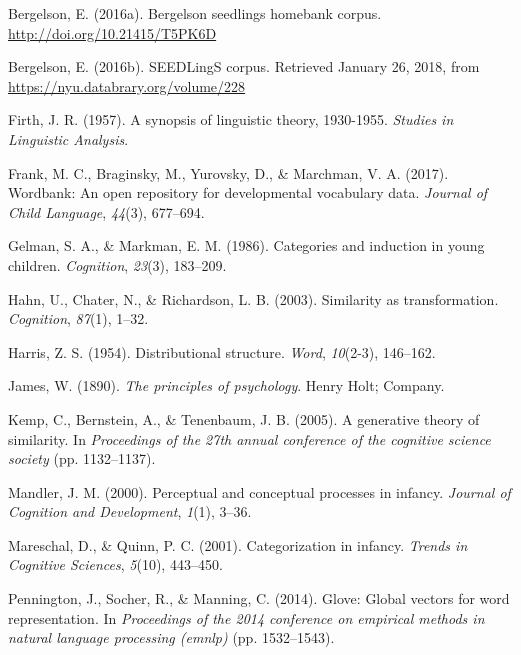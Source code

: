 \documentclass[10pt, letterpaper]{article}
\begin{document}
\hypertarget{refs}{}
\hypertarget{ref-bergelson2016seedlings}{}
Bergelson, E. (2016a). Bergelson seedlings homebank corpus.
\url{http://doi.org/10.21415/T5PK6D}

\hypertarget{ref-bergelson2016seedlingsdatabrary}{}
Bergelson, E. (2016b). SEEDLingS corpus. Retrieved January 26, 2018,
from \url{https://nyu.databrary.org/volume/228}

\hypertarget{ref-firth1957synopsis}{}
Firth, J. R. (1957). A synopsis of linguistic theory, 1930-1955.
\emph{Studies in Linguistic Analysis}.

\hypertarget{ref-frank2017wordbank}{}
Frank, M. C., Braginsky, M., Yurovsky, D., \& Marchman, V. A. (2017).
Wordbank: An open repository for developmental vocabulary data.
\emph{Journal of Child Language}, \emph{44}(3), 677--694.

\hypertarget{ref-gelman1986categories}{}
Gelman, S. A., \& Markman, E. M. (1986). Categories and induction in
young children. \emph{Cognition}, \emph{23}(3), 183--209.

\hypertarget{ref-hahn2003similarity}{}
Hahn, U., Chater, N., \& Richardson, L. B. (2003). Similarity as
transformation. \emph{Cognition}, \emph{87}(1), 1--32.

\hypertarget{ref-harris1954distributional}{}
Harris, Z. S. (1954). Distributional structure. \emph{Word},
\emph{10}(2-3), 146--162.

\hypertarget{ref-james2013principles}{}
James, W. (1890). \emph{The principles of psychology}. Henry Holt;
Company.

\hypertarget{ref-kemp2005generative}{}
Kemp, C., Bernstein, A., \& Tenenbaum, J. B. (2005). A generative theory
of similarity. In \emph{Proceedings of the 27th annual conference of the
cognitive science society} (pp. 1132--1137).

\hypertarget{ref-mandler2000perceptual}{}
Mandler, J. M. (2000). Perceptual and conceptual processes in infancy.
\emph{Journal of Cognition and Development}, \emph{1}(1), 3--36.

\hypertarget{ref-mareschal2001categorization}{}
Mareschal, D., \& Quinn, P. C. (2001). Categorization in infancy.
\emph{Trends in Cognitive Sciences}, \emph{5}(10), 443--450.

\hypertarget{ref-pennington2014glove}{}
Pennington, J., Socher, R., \& Manning, C. (2014). Glove: Global vectors
for word representation. In \emph{Proceedings of the 2014 conference on
empirical methods in natural language processing (emnlp)} (pp.
1532--1543).
\end{document}
